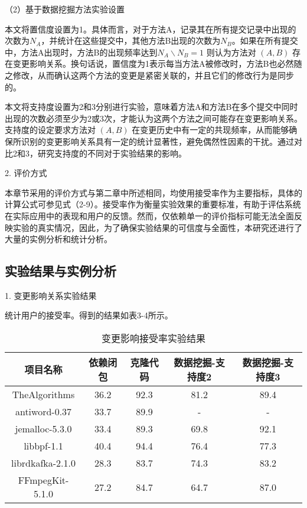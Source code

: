 （2）基于数据挖掘方法实验设置

本文将置信度设置为1。具体而言，对于方法A，记录其在所有提交记录中出现的次数为\(N_A\)，并统计在这些提交中，其他方法B出现的次数为\(N_B\)。如果在所有提交中，方法A出现时，方法B的出现频率达到\(N_A \backslash N_B = 1\)
则认为方法对 $(A, B)$ 存在变更影响关系。换句话说，置信度为1表示每当方法A被修改时，方法B也必然随之修改，从而确认这两个方法的变更是紧密关联的，并且它们的修改行为是同步的。

本文将支持度设置为2和3分别进行实验，意味着方法A和方法B在多个提交中同时出现的次数必须至少为2或3次，才能认为这两个方法之间可能存在变更影响关系。支持度的设定要求方法对 $(A, B)$ 在变更历史中有一定的共现频率，从而能够确保所识别的变更影响关系具有一定的统计显著性，避免偶然性因素的干扰。通过对比2和3，研究支持度的不同对于实验结果的影响。

2. 评价方式

本章节采用的评价方式与第二章中所述相同，均使用接受率作为主要指标，具体的计算公式可参见式（2-9）。接受率作为衡量实验效果的重要标准，有助于评估系统在实际应用中的表现和用户的反馈。然而，仅依赖单一的评价指标可能无法全面反映实验的真实情况，因此，为了确保实验结果的可信度与全面性，本研究还进行了大量的实例分析和统计分析。

\subsection{实验结果与实例分析}

1. 变更影响关系实验结果

统计用户的接受率。得到的结果如表3-4所示。

\begin{table}[htbp]
\caption{变更影响接受率实验结果}
\vspace{0.5em}\centering\wuhao
\begin{tabular}{ccccc}
\toprule
项目名称 & 依赖闭包 & 克隆代码 & 数据挖掘-支持度2 & 数据挖掘-支持度3 \\
\midrule
TheAlgorithms & 36.2 & 92.3 & 81.2 & 89.4\\
antiword-0.37 & 33.7 & 89.9 & - & -\\
jemalloc-5.3.0 & 33.4 & 89.3 & 69.8 & 92.1\\
libbpf-1.1 & 40.4 & 94.4 & 76.4 & 77.3\\
librdkafka-2.1.0 & 28.3 & 83.7 & 74.3 & 83.2\\
FFmpegKit-5.1.0 & 27.2 & 84.7 & 64.7 & 87.0\\

\bottomrule
\end{tabular}
\end{table}


